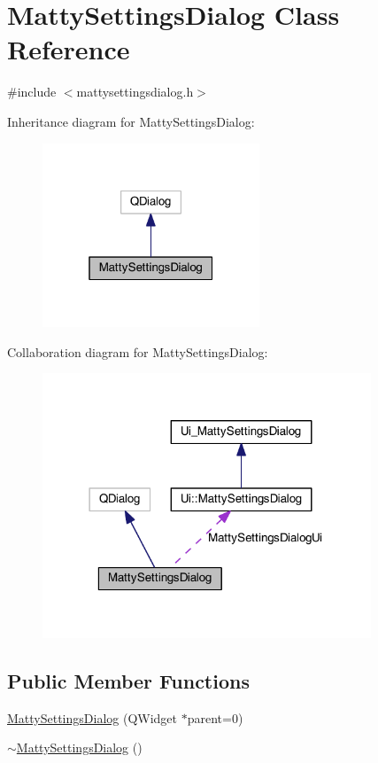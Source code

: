 \hypertarget{classMattySettingsDialog}{}\section{Matty\+Settings\+Dialog Class Reference}
\label{classMattySettingsDialog}


{\ttfamily \#include $<$mattysettingsdialog.\+h$>$}



Inheritance diagram for Matty\+Settings\+Dialog\+:
\nopagebreak
\begin{figure}[H]
\begin{center}
\leavevmode
\includegraphics[width=184pt]{classMattySettingsDialog__inherit__graph}
\end{center}
\end{figure}


Collaboration diagram for Matty\+Settings\+Dialog\+:
\nopagebreak
\begin{figure}[H]
\begin{center}
\leavevmode
\includegraphics[width=278pt]{classMattySettingsDialog__coll__graph}
\end{center}
\end{figure}
\subsection*{Public Member Functions}
\begin{DoxyCompactItemize}
\item 
\hyperlink{classMattySettingsDialog_a609bf8d82968105e72cf497216230451}{Matty\+Settings\+Dialog} (Q\+Widget $\ast$parent=0)
\item 
\hyperlink{classMattySettingsDialog_ae04421f7937d00dc4e05856d78e10d9a}{$\sim$\+Matty\+Settings\+Dialog} ()
\end{DoxyCompactItemize}
